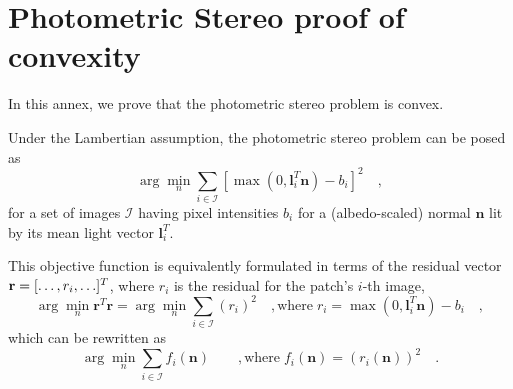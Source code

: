 \chapter{Photometric Stereo proof of convexity}     %
\label{annex2}

In this annex, we prove that the photometric stereo problem is convex.

Under the Lambertian assumption, the photometric stereo problem can be posed as
\begin{equation}
\arg\min_n \sum_{i \in \mathcal{I}} \left[ \max\left(0, \mathbf{l}_{i}^T \mathbf{n} \right) - b_i \right]^2 \quad ,
\label{eq:init} 
\end{equation}
for a set of images $\mathcal{I}$ having pixel intensities $b_{i}$ for a (albedo-scaled) normal $\mathbf{n}$ lit by its mean light vector $\mathbf{l}_{i}^T$.

This objective function is equivalently formulated in terms of the residual vector \mbox{${\bf r} = [\ldots ,  {r_i} , \ldots]^T$}, where $r_i$ is the residual for the patch's $i$-th image,
\begin{equation}
\arg\min_n  \mathbf{r}^T\mathbf{r} = \arg\min_n \sum_{i \in \mathcal{I}} (r_i)^2 \quad , \mathrm{where} \; r_i = \max( 0, \mathbf{l}_i^T \mathbf{n} ) - b_i \quad,
\label{eq:defresidual}
\end{equation}
%
which can be rewritten as
%
\begin{equation}
\arg\min_n \sum_{i \in \mathcal{I}} f_i(\mathbf{n})
\qquad, \mathrm{where} \; f_i(\mathbf{n}) = \left( r_i(\mathbf{n}) \right)^2 \quad.
\end{equation}
%

